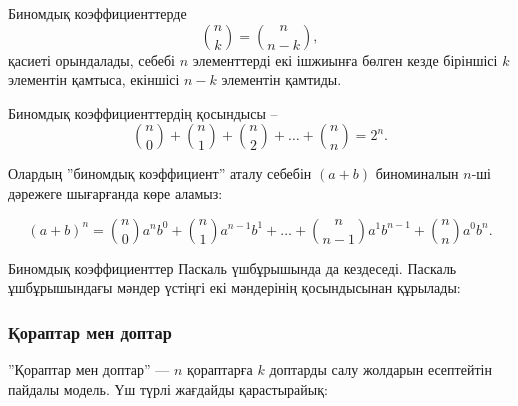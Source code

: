 Биномдық коэффициенттерде
\[
{n \choose k}  =  {n \choose n-k},
\]
қасиеті орындалады, себебі $n$ элементтерді екі
ішжиынға бөлген кезде біріншісі $k$ элементін қамтыса,
екіншісі $n-k$ элементін қамтиды. 


Биномдық коэффициенттердің қосындысы --
\[
{n \choose 0}+{n \choose 1}+{n \choose 2}+\ldots+{n \choose n}=2^n.
\]

Олардың ''биномдық коэффициент'' аталу себебін  
$(a+b)$ биноминалын $n$-ші дәрежеге шығарғанда 
көре аламыз:


\[ (a+b)^n =
{n \choose 0} a^n b^0 + 
{n \choose 1} a^{n-1} b^1 +
\ldots + 
{n \choose n-1} a^1 b^{n-1} +
{n \choose n} a^0 b^n. \]


Биномдық коэффициенттер Паскаль үшбұрышында да
кездеседі. Паскаль ұшбұрышындағы мәндер үстіңгі екі
мәндерінің қосындысынан құрылады:
\begin{center}  
\end{center}

\subsubsection{Қораптар мен доптар}

''Қораптар мен доптар'' –– $n$ қораптарға
$k$ доптарды салу жолдарын есептейтін 
пайдалы модель. Үш түрлі жағдайды қарастырайық:

